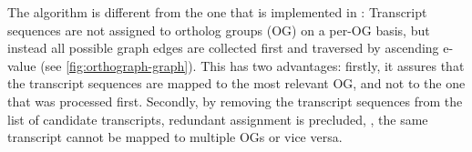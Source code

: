The \pname algorithm is different from the one that is implemented in \hamstr:
Transcript sequences are not assigned to ortholog groups (OG) on a per-OG basis,
but instead all possible graph edges are collected first and traversed by
ascending  e-value (see \autoref{fig:orthograph-graph}). This
has two advantages: firstly, it assures that the transcript sequences are mapped
to the most relevant OG, and not to the one that was processed first. Secondly,
by removing the transcript sequences from the list of candidate transcripts,
redundant assignment is precluded, \ie, the same transcript cannot be mapped to
multiple OGs or vice versa.
